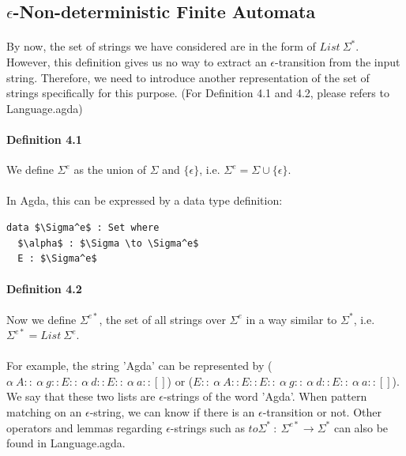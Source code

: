 \documentclass[twoside,openright,final]{bhamthesis}
\begin{document}
\subsection{\(\epsilon\)-Non-deterministic Finite Automata}

\paragraph{} By now, the set of strings we have considered are in the form of
\(List\ \Sigma^*\). However, this definition gives us no way to
extract an \(\epsilon\)-transition from the input string. Therefore, we need to introduce another
representation of the set of strings specifically for this purpose. (For Definition 4.1 and
4.2, please refers to Language.agda)

\paragraph{Definition 4.1} We define \(\Sigma^e\) as the union of
\(\Sigma\) and \(\{\epsilon\}\), i.e. \(\Sigma^e = \Sigma \cup
\{\epsilon\}\). 

\paragraph{} In Agda, this can be expressed by a data type definition:
\begin{lstlisting}[mathescape=true,xleftmargin=.4\textwidth,aboveskip=0pt,belowskip=0pt]
data $\Sigma^e$ : Set where
  $\alpha$ : $\Sigma \to \Sigma^e$
  E : $\Sigma^e$
\end{lstlisting}

\paragraph{Definition 4.2} Now we define \(\Sigma^{e*}\), the set of all strings over
\(\Sigma^e\) in a way similar to \(\Sigma^*\), i.e. \(\Sigma^{e*} =
List\ \Sigma^e\). 

\paragraph{} For example, the string 'Agda' can be
represented by (\(\alpha\ A ::\ \alpha\ g :: E ::\ \alpha\ d :: E ::\ \alpha\
a :: []\)) or (\(E ::\ \alpha\ A :: E :: E ::\ \alpha\ g ::\ \alpha\ d :: E ::\ \alpha\
a :: []\)). We say that these two lists are
\(\epsilon\)-strings of the word 'Agda'. When pattern matching on an \(\epsilon\)-string, we
can know if there is an \(\epsilon\)-transition or not. Other operators and lemmas
regarding \(\epsilon\)-strings such
as \(to\Sigma^*\ :\ \Sigma^{e*} \to \Sigma^*\) can also be found in
Language.agda. 
\end{document}
